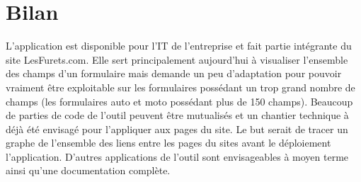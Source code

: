 \documentclass[12pt,a4paper,oldfontcommands]{article}
\begin{document}
\section{Bilan}
L'application est disponible pour l'IT de l'entreprise et fait partie intégrante du site LesFurets.com. Elle sert principalement aujourd'hui à visualiser l'ensemble des champs d'un formulaire mais demande un peu d'adaptation pour pouvoir vraiment être exploitable sur les formulaires possédant un trop grand nombre de champs (les formulaires auto et moto possédant plus de 150 champs). Beaucoup de parties de code de l'outil peuvent être mutualisés et un chantier technique à déjà été envisagé pour l'appliquer aux pages du site. Le but serait de tracer un graphe de l'ensemble des liens entre les pages du sites avant le déploiement l'application. D'autres applications de l'outil sont envisageables à moyen terme ainsi qu'une documentation complète.
\end{document}
